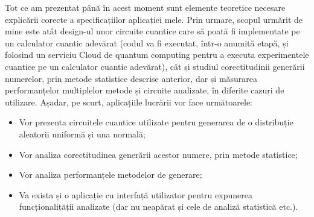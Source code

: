 Tot ce am prezentat până în acest moment sunt elemente teoretice necesare explicării corecte a specificațiilor aplicației mele. Prin urmare, scopul urmărit de mine este atât design-ul unor circuite cuantice care să poată fi implementate pe un calculator cuantic adevărat (codul va fi executat, într-o anumită etapă, și folosind un serviciu Cloud de quantum computing pentru a executa experimentele cuantice pe un calculator cuantic adevărat), cât și studiul corectitudinii generării numerelor, prin metode statistice descrise anterior, dar și măsurarea performanțelor multiplelor metode și circuite analizate, în diferite cazuri de utilizare. 
Așadar, pe scurt, aplicațiile lucrării vor face următoarele:
\begin{itemize}
    \item Vor prezenta circuitele cuantice utilizate pentru generarea de o distribuție aleatorii uniformă și una normală;
    \item Vor analiza corectitudinea generării acestor numere, prin metode statistice;
    \item Vor analiza performanțele metodelor de generare;
    \item Va exista și o aplicație cu interfață utilizator pentru expunerea funcționalițății analizate (dar nu neapărat și cele de analiză statistică etc.).
\end{itemize}




